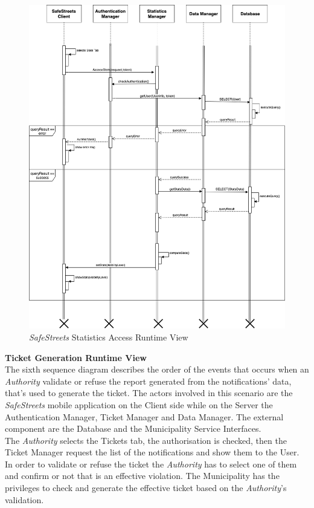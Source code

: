 \documentclass{article}
\begin{document}
	\begin{figure}[H]
			\centering
			\includegraphics[scale=0.34]{Images/Diagrams/Runtime/stats_runtime.png}
			\caption{{\it SafeStreets} Statistics Access Runtime View}
	\end{figure}
	\pagebreak
	\noindent
	{\bf Ticket Generation Runtime View} \\
	The sixth sequence diagram describes the order of the events that occurs when an {\it Authority} validate or refuse the report generated from the notifications' data, that's used to generate the ticket. The actors involved in this scenario are the {\it SafeStreets} mobile application on the Client side while on the Server the Authentication Manager, Ticket Manager and Data Manager. The external component are the Database and the Municipality Service Interfaces. \\
	The {\it Authority} selects the Tickets tab, the authorisation is checked, then the Ticket Manager request the list of the notifications and show them to the User. In order to validate or refuse the ticket the {\it Authority} has to select one of them and confirm or not that is an effective violation. The Municipality has the privileges to check and generate the effective ticket based on the {\it Authority}'s validation.
\end{document}
